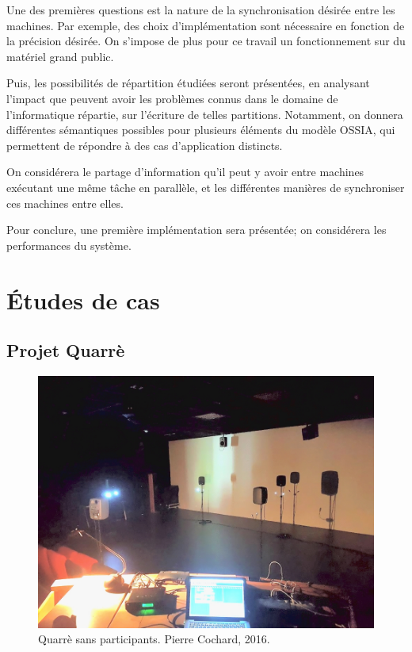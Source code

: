 \documentclass{article}
\newcommand\ossia{OSSIA\xspace}
\begin{document}
Une des premières questions est la nature de la synchronisation désirée entre les machines.
Par exemple, des choix d'implémentation sont nécessaire en fonction de la précision désirée. 
On s'impose de plus pour ce travail un fonctionnement sur du matériel grand public.

Puis, les possibilités de répartition étudiées seront présentées, en analysant l'impact que peuvent avoir les problèmes connus dans le domaine de l'informatique répartie, sur l'écriture de telles partitions. 
Notamment, on donnera différentes sémantiques possibles pour plusieurs éléments du modèle \ossia, qui permettent de répondre à des cas d'application distincts. 

On considérera le partage d'information qu'il peut y avoir entre machines exécutant une même tâche en parallèle, et les différentes manières de synchroniser ces machines entre elles.

Pour conclure, une première implémentation sera présentée; on considérera les performances du système.

\section{Études de cas}

\subsection{Projet Quarrè}

\begin{figure}[h]
    \centering
    \includegraphics[scale=0.2]{images/quarre.jpg}
    \caption[Quarrè]{Quarrè sans participants. Pierre Cochard, 2016.}
    \label{img.quarre}
\end{figure}
\end{document}
